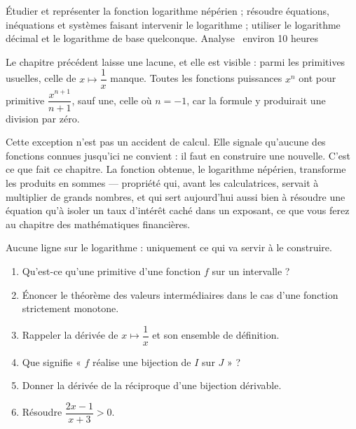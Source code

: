   {Étudier et représenter la fonction logarithme népérien ; résoudre
   équations, inéquations et systèmes faisant intervenir le logarithme ;
   utiliser le logarithme décimal et le logarithme de base quelconque.}
  {Analyse \textbullet\ environ 10 heures}

Le chapitre précédent laisse une lacune, et elle est visible : parmi les
primitives usuelles, celle de $x \mapsto \dfrac{1}{x}$ manque. Toutes les
fonctions puissances $x^{n}$ ont pour primitive $\dfrac{x^{n+1}}{n+1}$, sauf
une, celle où $n = -1$, car la formule y produirait une division par zéro.

Cette exception n'est pas un accident de calcul. Elle signale qu'aucune des
fonctions connues jusqu'ici ne convient : il faut en construire une nouvelle.
C'est ce que fait ce chapitre. La fonction obtenue, le logarithme népérien,
transforme les produits en sommes — propriété qui, avant les calculatrices,
servait à multiplier de grands nombres, et qui sert aujourd'hui aussi bien à
résoudre une équation qu'à isoler un taux d'intérêt caché dans un exposant, ce
que vous ferez au chapitre des mathématiques financières.

\begin{revision}
Aucune ligne sur le logarithme : uniquement ce qui va servir à le construire.

\begin{enumerate}[label=\textbf{\arabic*.}, leftmargin=*, itemsep=0.35em]
  \item Qu'est-ce qu'une primitive d'une fonction $f$ sur un intervalle ?
  \item Énoncer le théorème des valeurs intermédiaires dans le cas d'une
        fonction strictement monotone.
  \item Rappeler la dérivée de $x \mapsto \dfrac{1}{x}$ et son ensemble de
        définition.
  \item Que signifie « $f$ réalise une bijection de $I$ sur $J$ » ?
  \item Donner la dérivée de la réciproque d'une bijection dérivable.
  \item Résoudre $\dfrac{2x-1}{x+3} > 0$.
\end{enumerate}
\end{revision}

